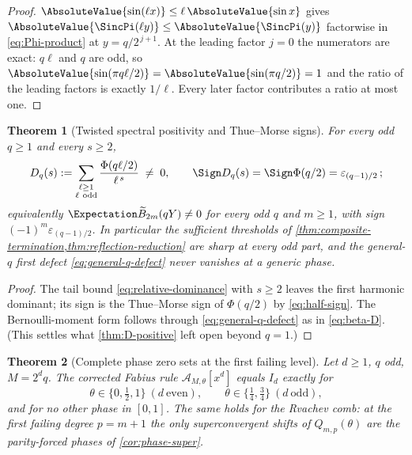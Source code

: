 \documentclass[11pt,oneside]{article}
\numberwithin{equation}{section}
\newtheorem{theorem}{Theorem}[section]
\theoremstyle{definition}
\theoremstyle{remark}
\newcommand{\eps}{\varepsilon}
\begin{document}
\begin{proof}
$\AbsoluteValue{\sin(\ell x)}\le\ell\,\AbsoluteValue{\sin x}$ gives
$\AbsoluteValue{\SincPi(\ell y)}\le\AbsoluteValue{\SincPi(y)}$ factorwise in
\eqref{eq:Phi-product} at $y=q/2^{\,j+1}$.  At the leading factor
$j=0$ the numerators are exact: $q\ell$ and $q$ are odd, so
$\AbsoluteValue{\sin(\pi q\ell/2)}=\AbsoluteValue{\sin(\pi q/2)}=1$ and the ratio of the
leading factors is exactly $1/\ell$.  Every later factor contributes
a ratio at most one.
\end{proof}

\begin{theorem}[Twisted spectral positivity and Thue--Morse signs]
\label{thm:twisted-D-positive}
For every odd $q\ge1$ and every $s\ge2$,
\begin{equation}
 D_q(s):=\sum_{\substack{\ell\ge1\\ \ell\ \mathrm{odd}}}
 \frac{\Phi(q\ell/2)}{\ell^{\,s}}
 \;\ne\;0,
 \qquad
 \Sign D_q(s)=\Sign\Phi(q/2)=\eps_{(q-1)/2}\,;
 \label{eq:twisted-positive}
\end{equation}
equivalently $\Expectation\widetilde B_{2m}(qY)\ne0$ for every odd $q$ and
$m\ge1$, with sign $(-1)^{m}\eps_{(q-1)/2}$.  In particular the
sufficient thresholds of
\cref{thm:composite-termination,thm:reflection-reduction} are sharp
at \emph{every} odd part, and the general-$q$ first defect
\eqref{eq:general-q-defect} never vanishes at a generic phase.
\end{theorem}

\begin{proof}
The tail bound \eqref{eq:relative-dominance} with $s\ge2$ leaves the
first harmonic dominant; its sign is the Thue--Morse sign of
$\Phi(q/2)$ by \eqref{eq:half-sign}.  The Bernoulli-moment form
follows through \eqref{eq:general-q-defect} as in \eqref{eq:beta-D}.
(This settles what \cref{thm:D-positive} left open beyond $q=1$.)
\end{proof}

\begin{theorem}[Complete phase zero sets at the first failing level]
\label{thm:phase-zero-set}
Let $d\ge1$, $q$ odd, $M=2^{d}q$.  The corrected Fabius rule
$\mathcal A_{M,\theta}[x^{d}]$ equals $I_d$ exactly for
\begin{equation}
 \theta\in\{0,\tfrac12,1\}\ (d\ \text{even}),
 \qquad
 \theta\in\{\tfrac14,\tfrac34\}\ (d\ \text{odd}),
 \label{eq:zero-set}
\end{equation}
and for \emph{no other} phase in $[0,1]$.  The same holds for the
Rvachev comb: at the first failing degree $p=m+1$ the only
superconvergent shifts of $Q_{m,p}(\theta)$ are the parity-forced
phases of \cref{cor:phase-super}.
\end{theorem}
\end{document}
